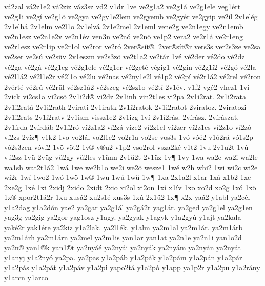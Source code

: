 {v^^e12zal
v^^e12z1e2
v^^e12ziz
v^^e1z3sz
vd2
v1dr
1ve
ve2g1a2
ve2g1^^e1
ve2g1ele
veg1^^e9rt
ve2g1i
ve2g^^ed
ve2g1^^f6
ve2gya
ve2gy1e2lem
ve2gyemb
ve2gy^^e9r
ve2gyip
ve2il
2v1el^^e9g
2v1elh^^e1
2v1elm
ve2l1o
2v1elv^^e1
2v1e2mel
2v1eml
vene2g
ve2n1egy
ve2n1emb
ve2n1esz
ve2n1e2v
ve2n1^^e9v
ven3n
ve2n^^f3
ve2n^^f6
ve1p2
vera2
ve2r1^^e1
ve2r1eng
ve2r1esz
ve2r1ip
ve2r1ol
ve2ror
ve2r^^f3
2ver^^aes^^edt^^ae.
2ver^^aes^^edt^^aer
vers3s
ver2s3ze
ve2sa
ve2ser
ve2s^^fa
ve2s^^fcv
2v1eszm
ve2s3z^^f6
ve2t1a2
ve2t^^e1r
1v^^e9
v^^e92der
v^^e92do
v^^e92dz
v^^e92ga
v^^e92g^^e1
v^^e92g1eg
v^^e92g1ele
v^^e92g1er
v^^e92get^^e9
v^^e9gig1
v^^e92gin
v^^e92g1^^ed2
v^^e92g^^f3
v^^e92la
v^^e92l1^^e12
v^^e92l1e2r
v^^e92l1o
v^^e92lu
v^^e92nas
v^^e92ny1e2l
v^^e91p2
v^^e92p^^ed
v^^e92r1^^e12
v^^e92rel
v^^e92ron
2v^^e9rt^^e9
v^^e92r^^fa
v^^e92r^^fcl
v^^e92sz1^^e12
v^^e92szeg
v^^e92sz1o
v^^e92t^^ed
2v1^^e9v.
v1f2
vg^^e92
vhez1
1vi
2vick
vi2cs1a
vi2cs^^f6
2v1i2d^^ae
vi2dz
2v1inh
vin2t1es
vi2pa
2v1i2rat.
2v1i2rata
2v1i2rat^^e1
2v1i2rath
2virati
2v1iratk
2v1i2ratok
2v1i2ratot
2viratoz.
2viratozi
2v1i2rats
2v1i2ratv
2v1ism
vissz1e2
2v1izg
1v^^ed
2v1^^ed2r^^e1s.
2v^^edr^^e1sz.
2v^^edr^^e1szat.
2v1^^edrda
2v^^edrd^^e1b
2v1^^ed2r^^f3
v^^ed2z1a2
v^^ed2z^^e1
v^^edze2
v^^ed2z1el
v^^ed2zer
v^^ed2z1es
v^^ed2z1o
v^^ed2z^^f3
v^^ed2zs
2v^^edz^^b6
v1k2
1vo
vo2l^^e1l
vo2l1e2
vo2r1a
vo2se
vos3s
1v^^f3
v^^f3^^e92
v1^^f32r^^e1
v^^f31s2p
v^^f32s3zen
v^^f3v^^ed2
1v^^f6
v^^f6t2
1v^^ae
v^^aeu2
v1p2
vso2rol
vsza2k^^e9
v1t2
1vu
2v1u2t
1v^^fa
v^^fa2sz
1v^^fc
2v^^fcg
v^^fc2gy
v^^fc2les
v1^^fcnn
2v1^^fc2t
2v1^^fcz
1v^^b6
1vy
1wa
wa2e
wa2i
wa2le
wa1sh
wat2t1^^e12
1w^^e1
1we
we2b1o
we2i
we2^^f6
wesze1
1w^^e9
w2h
whi2
1wi
wi2c
wi2e
wi2r
1w^^ed
1wo2
1w^^f3
1w^^f6
1w^^ae
1wu
1w^^fa
1w^^fc
1w^^b6
1xa
2x1a2l
x1ar
1x^^e1
x1b2
1xe
2xe2g
1x^^e9
1xi
2xidj
2xido
2xidt
2xio
xi2ol
xi2on
1x^^ed
x1^^edv
1xo
xo2d
xo2g
1x^^f3
1x^^f6
1x^^ae
xpor2t1^^e12r
1xu
xus^^e12
xu2s1^^e9
xus3s
1x^^fa
2x1^^fc2
1x^^b6
x2x
ya^^e12
y1abl
ya2c^^e9l
y1a2dag
y1a2d^^f3n
yae2
ya2gar
ya2g1^^e1l
ya2g^^e12r
yag1^^e1r.
ya2ged
ya2g1el
ya2g1en
yag3g
ya2gig
ya2gor
yag1osz
y1agy.
ya2gyak
y1agyk
y1a2gy^^fa
y1ajt
ya2kala
yak^^e92r
yak1^^e9re
ya2kiz
y1a2lak.
ya2l1^^e9k.
y1alm
ya2m1al
ya2m1^^e1r.
ya2m1^^e1rb
ya2m1^^e1rh
ya2m1^^e1rn
ya2mel
ya2m1is
yan1ar
yan1at
ya2n1e
ya2n1i
yan1o2d
ya2n^^ae
yan1^^aek
yan1^^aet
ya2ny^^e1^^e9
ya2ny^^e1i
ya2ny^^e1k
ya2ny^^e1m
ya2ny^^e1n
ya2ny^^e1t
y1anyj
y1a2ny^^f3
ya2pa.
ya2pas
y1a2p^^e1b
y1a2p^^e1k
y1a2p^^e1m
y1a2p^^e1n
y1a2p^^e1r
y1a2p^^e1s
y1a2p^^e1t
y1a2p^^e1v
y1a2pi
yapo2t^^e1
y1a2p^^f3
y1app
ya1p2r
y1a2pu
y1a2r^^e1ny
y1arcn
y1arco
}
